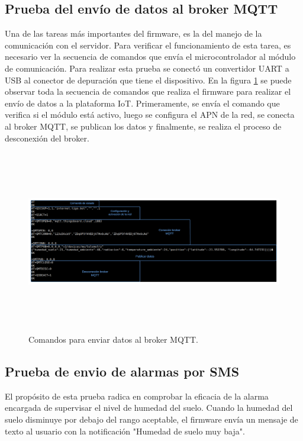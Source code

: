 \subsection{Prueba del envío de datos al broker MQTT}
Una de las tareas más importantes del firmware, es la del manejo de la comunicación con el servidor. Para verificar el funcionamiento de esta tarea, es necesario ver la secuencia de comandos que envía el microcontrolador al módulo de comunicación.
Para realizar esta prueba se conectó un convertidor UART a USB al conector de depuración que tiene el dispositivo.
En la figura \ref{fig:secuencia de comandos shell} se puede observar toda la secuencia de comandos que realiza el firmware para realizar el envío de datos a la plataforma IoT. Primeramente, se envía el comando que verifica si el módulo está activo, luego se configura el APN de la red, se conecta al broker MQTT, se publican los datos y finalmente, se realiza el proceso de desconexión del broker.

\begin{figure}[h]
  \centering
    \includegraphics[width=13cm, height=8cm]{./Figures/trama_envio_datos3.png}
  \caption{Comandos para enviar datos al broker MQTT.}
    \label{fig:secuencia de comandos shell}
\end{figure}

\subsection{Prueba de envio de alarmas por SMS}
El propósito de esta prueba radica en comprobar la eficacia de la alarma encargada de supervisar el nivel de humedad del suelo. Cuando la humedad del suelo disminuye por debajo del rango aceptable, el firmware envía un mensaje de texto al usuario con la notificación "Humedad de suelo muy baja". 

